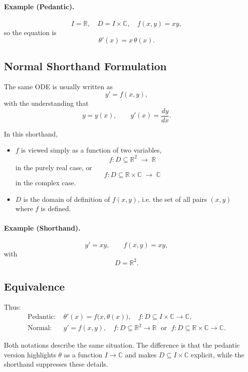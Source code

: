 \documentclass[11pt,a4paper]{article}
\begin{document}
	\paragraph{Example (Pedantic).}  
	$$
	I = \mathbb{R}, \quad 
	D = I \times \mathbb{C}, \quad
	f(x,y) = x y,
	$$
	so the equation is
	$$
	\theta'(x) = x \, \theta(x).
	$$
	
	\subsection*{Normal Shorthand Formulation}
	
	The same ODE is usually written as
	$$
	y' = f(x,y),
	$$
	with the understanding that
	$$
	y = y(x), \qquad y'(x) = \frac{dy}{dx}.
	$$
	
	In this shorthand,
	\begin{itemize}
		\item $f$ is viewed simply as a function of two variables,
		$$
		f : D \subseteq \mathbb{R}^2 \;\longrightarrow\; \mathbb{R}
		$$
		in the purely real case, or
		$$
		f : D \subseteq \mathbb{R} \times \mathbb{C} \;\longrightarrow\; \mathbb{C}
		$$
		in the complex case.
		\item $D$ is the domain of definition of $f(x,y)$, i.e. the set of all pairs $(x,y)$ where $f$ is defined.
	\end{itemize}
	
	\paragraph{Example (Shorthand).}  
	$$
	y' = xy, \qquad f(x,y) = xy,
	$$
	with
	$$
	D = \mathbb{R}^2.
	$$
	
	\subsection*{Equivalence}
	
	Thus:
	\begin{align*}
		\text{Pedantic: } & \theta'(x) = f\bigl(x,\theta(x)\bigr), 
		\quad f : D \subseteq I \times \mathbb{C} \to \mathbb{C}, \\[6pt]
		\text{Normal: } & y' = f(x,y), 
		\quad f : D \subseteq \mathbb{R}^2 \to \mathbb{R} \; \text{ or } \; f : D \subseteq \mathbb{R} \times \mathbb{C} \to \mathbb{C}.
	\end{align*}
	
	Both notations describe the same situation.  
	The difference is that the pedantic version highlights $\theta$ as a function $I \to \mathbb{C}$ and makes $D \subseteq I \times \mathbb{C}$ explicit, while the shorthand suppresses these details.
	
\end{document}
